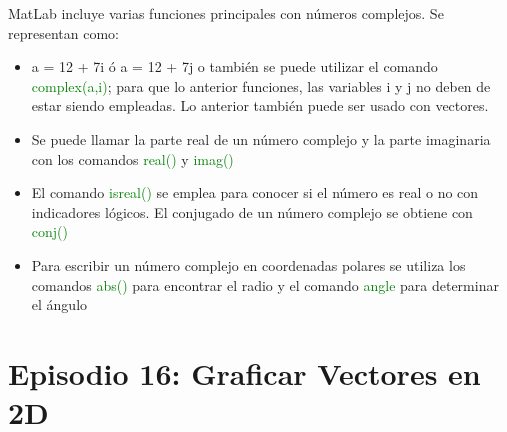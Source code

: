 \documentclass{article}
\begin{document}
	MatLab incluye varias funciones principales con números complejos.
	Se representan como:
	\begin{itemize}
		\item a = 12 + 7i ó a = 12 + 7j o también se puede utilizar el comando \textcolor{green}{complex(a,i)}; para que lo anterior funciones, las variables i y j no deben de estar siendo empleadas. Lo anterior también puede ser usado con vectores.

		\item Se puede llamar la parte real de un número complejo y la parte imaginaria con los comandos \textcolor{green}{real()} y \textcolor{green}{imag()}
	
		\item El comando \textcolor{green}{isreal()} se emplea para conocer si el número es real o no con indicadores lógicos.
		El conjugado de un número complejo se obtiene con \textcolor{green}{conj()}
	
		\item  Para escribir un número complejo en coordenadas polares se utiliza los comandos \textcolor{green}{abs()} para encontrar el radio y el comando \textcolor{green}{angle} para determinar el ángulo	
	\end{itemize}
	
	\section{Episodio 16: Graficar Vectores en 2D}
	
\end{document}
